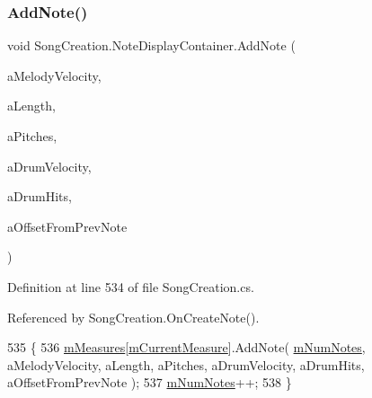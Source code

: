\subsubsection{\texorpdfstring{Add\+Note()}{AddNote()}}
{\footnotesize\ttfamily void Song\+Creation.\+Note\+Display\+Container.\+Add\+Note (\begin{DoxyParamCaption}\item[{int}]{a\+Melody\+Velocity,  }\item[{\hyperlink{group___music_enums_gaf11b5f079adbb21c800b9eca1c5c3cbd}{Music.\+N\+O\+T\+E\+\_\+\+L\+E\+N\+G\+TH}}]{a\+Length,  }\item[{\hyperlink{group___music_enums_ga508f69b199ea518f935486c990edac1d}{Music.\+P\+I\+T\+CH} \mbox{[}$\,$\mbox{]}}]{a\+Pitches,  }\item[{int}]{a\+Drum\+Velocity,  }\item[{\hyperlink{group___music_enums_gade475b4382c7066d1af13e7c13c029b6}{Music.\+D\+R\+UM} \mbox{[}$\,$\mbox{]}}]{a\+Drum\+Hits,  }\item[{\hyperlink{group___music_enums_gaf11b5f079adbb21c800b9eca1c5c3cbd}{Music.\+N\+O\+T\+E\+\_\+\+L\+E\+N\+G\+TH}}]{a\+Offset\+From\+Prev\+Note }\end{DoxyParamCaption})}



Definition at line 534 of file Song\+Creation.\+cs.



Referenced by Song\+Creation.\+On\+Create\+Note().


\begin{DoxyCode}
535         \{
536             \hyperlink{class_song_creation_1_1_note_display_container_a19c1c32db579c642fbc1b5bce0c80e7a}{mMeasures}[\hyperlink{class_song_creation_1_1_note_display_container_ad63614e1c51c2db44cfc0fc21704c4ff}{mCurrentMeasure}].AddNote( 
      \hyperlink{class_song_creation_1_1_note_display_container_a5ce614dc2b8f3d41f885639a92c97b1b}{mNumNotes}, aMelodyVelocity, aLength, aPitches, aDrumVelocity, aDrumHits, aOffsetFromPrevNote );
537             \hyperlink{class_song_creation_1_1_note_display_container_a5ce614dc2b8f3d41f885639a92c97b1b}{mNumNotes}++;
538         \}
\end{DoxyCode}
\mbox{\label{class_song_creation_1_1_note_display_container_a42c39fa44ccac736377809dbec6642db}} 
